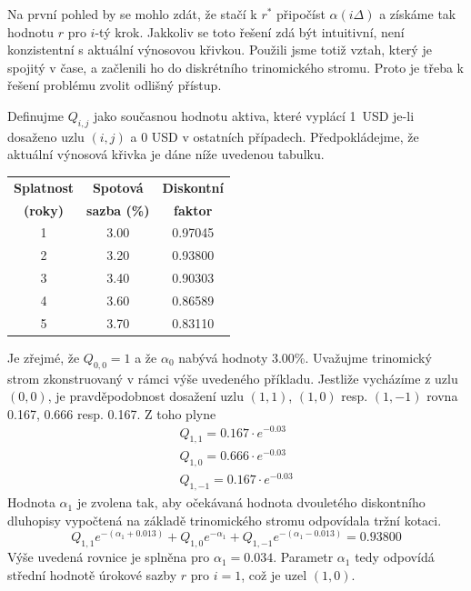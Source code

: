 \documentclass[a4paper]{book}
\begin{document}
Na první pohled by se mohlo zdát, že stačí k $r^{*}$ připočíst $\alpha(i \Delta)$ a získáme tak hodnotu $r$ pro $i$-tý krok. Jakkoliv se toto řešení zdá být intuitivní, není konzistentní s aktuální výnosovou křivkou. Použili jsme totiž vztah, který je spojitý v čase, a začlenili ho do diskrétního trinomického stromu. Proto je třeba k řešení problému zvolit odlišný přístup.

Definujme $Q_{i,j}$ jako současnou hodnotu aktiva, které vyplácí 1~USD je-li dosaženo uzlu $(i,j)$ a 0 USD v ostatních případech. Předpokládejme, že aktuální výnosová křivka je dáne níže uvedenou tabulku.
\begin{center}
\begin{tabular}{c c c}
\textbf{Splatnost} & \textbf{Spotová} & \textbf{Diskontní} \\
\textbf{(roky)} & \textbf{sazba (\%)} & \textbf{faktor} \\
\hline
1 & 3.00 & 0.97045 \\
2 & 3.20 & 0.93800 \\
3 & 3.40 & 0.90303 \\
4 & 3.60 & 0.86589 \\
5 & 3.70 & 0.83110
\end{tabular}
\end{center}
Je zřejmé, že $Q_{0,0} = 1$ a že $\alpha_0$ nabývá hodnoty 3.00\%. Uvažujme trinomický strom zkonstruovaný v rámci výše uvedeného příkladu. Jestliže vycházíme z uzlu $(0,0)$, je pravděpodobnost dosažení uzlu $(1,1)$, $(1,0)$ resp. $(1,-1)$ rovna 0.167, 0.666 resp. 0.167. Z toho plyne
\begin{equation*}
\begin{split}
Q_{1,1} = 0.167 \cdot e^{-0.03}\\
Q_{1,0} = 0.666 \cdot e^{-0.03}\\
Q_{1,-1} = 0.167 \cdot e^{-0.03}
\end{split}
\end{equation*}
Hodnota $\alpha_1$ je zvolena tak, aby očekávaná hodnota dvouletého diskontního dluhopisy vypočtená na základě trinomického stromu odpovídala tržní kotaci.
\begin{equation*}
Q_{1,1}e^{-(\alpha_1 + 0.013)} + Q_{1,0}e^{-\alpha_1} + Q_{1,-1}e^{-(\alpha_1 - 0.013)} = 0.93800
\end{equation*}
Výše uvedená rovnice je splněna pro $\alpha_1 = 0.034$. Parametr $\alpha_1$ tedy odpovídá střední hodnotě úrokové sazby $r$ pro $i=1$, což je uzel $(1,0)$.
\end{document}
